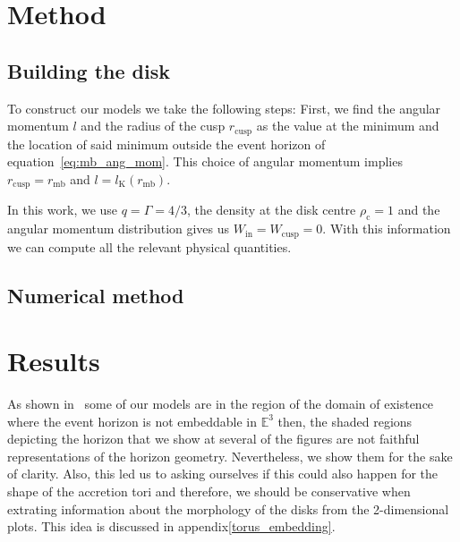 \documentclass[twocolumn,aps,showpacs,showkeys,prd,superscriptaddress,byrevtex, amsmath]{revtex4-1}
\begin{document}
\section{Method}

\subsection{Building the disk}

To construct our models we take the following steps:
First, we find the angular momentum $l$ and the radius of the cusp $r_{\mathrm{cusp}}$ as the value at the minimum and the location of said minimum outside the event horizon of equation~\eqref{eq:mb_ang_mom}. This choice of angular momentum implies $r_{\mathrm{cusp}} = r_{\mathrm{mb}}$ and $l = l_{\mathrm{K}}(r_{\mathrm{mb}})$.

In this work, we use $q = \Gamma = 4/3$, the density at the disk centre $\rho_{\mathrm{c}} = 1$ and the angular momentum distribution gives us $W_{\mathrm{in}} = W_{\mathrm{cusp}} = 0$. With this information we can compute all the relevant physical quantities.

\subsection{Numerical method}

\section{Results}

As shown in~\cite{Delgado:2018} some  of our models are in the region of the domain of existence where the event horizon is not embeddable in $\mathbb{E}^3$ then, the shaded regions depicting the horizon that we show at several of the figures are not faithful representations of the horizon geometry. Nevertheless, we show them for the sake of clarity. Also, this led us to asking ourselves if this could also happen for the shape of the accretion tori and therefore, we should be conservative when extrating information about the morphology of the disks from the 2-dimensional plots. This idea is discussed in appendix\ref{torus_embedding}.
\end{document}
